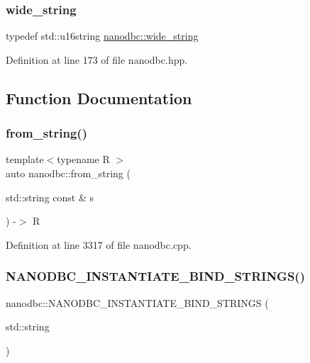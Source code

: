 \subsubsection{\texorpdfstring{wide\_string}{wide\_string}}
{\footnotesize\ttfamily typedef std\+::u16string \mbox{\hyperlink{namespacenanodbc_aeddf33f0df2bb9ba05323112e3aed316}{nanodbc\+::wide\+\_\+string}}}



Definition at line 173 of file nanodbc.\+hpp.



\subsection{Function Documentation}
\mbox{\label{namespacenanodbc_a4cd107d8dff968512bfb806d7798a5f2}} 
\subsubsection{\texorpdfstring{from\_string()}{from\_string()}}
{\footnotesize\ttfamily template$<$typename R $>$ \\
auto nanodbc\+::from\+\_\+string (\begin{DoxyParamCaption}\item[{std\+::string const \&}]{s }\end{DoxyParamCaption}) -\/$>$ R
}



Definition at line 3317 of file nanodbc.\+cpp.

\mbox{\label{namespacenanodbc_affb3519ec607369744551f28d664ad1e}} 
\subsubsection{\texorpdfstring{NANODBC\_INSTANTIATE\_BIND\_STRINGS()}{NANODBC\_INSTANTIATE\_BIND\_STRINGS()}\hspace{0.1cm}{\footnotesize\ttfamily [1/2]}}
{\footnotesize\ttfamily nanodbc\+::\+N\+A\+N\+O\+D\+B\+C\+\_\+\+I\+N\+S\+T\+A\+N\+T\+I\+A\+T\+E\+\_\+\+B\+I\+N\+D\+\_\+\+S\+T\+R\+I\+N\+GS (\begin{DoxyParamCaption}\item[{std\+::string}]{ }\end{DoxyParamCaption})}

